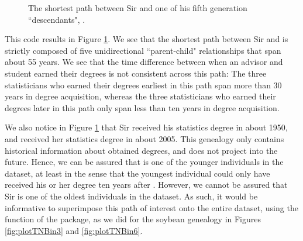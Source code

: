 \documentclass[article,shortnames]{jss}
\begin{document}
\begin{figure}[H]
    \centering
    \caption{The shortest path between Sir  and one of his fifth generation ``descendants", .}
    \label{fig:pathCB}
\end{figure}

This code results in Figure \ref{fig:pathCB}. We see that the shortest path between Sir  and  is strictly composed of five unidirectional ``parent-child" relationships that span about 55 years. We see that the time difference between when an advisor and student earned their degrees is not consistent across this path: The three statisticians who earned their degrees earliest in this path span more than 30 years in degree acquisition, whereas the three statisticians who earned their degrees later in this path only span less than ten years in degree acquisition.

We also notice in Figure \ref{fig:pathCB} that Sir  received his statistics degree in about 1950, and  received her statistics degree in about 2005. This genealogy only contains historical information about obtained degrees, and does not project into the future. Hence, we can be assured that  is one of the younger individuals in the dataset, at least in the sense that the youngest individual could only have received his or her degree ten years after . However, we cannot be assured that Sir  is one of the oldest individuals in the dataset. As such, it would be informative to superimpose this path of interest onto the entire dataset, using the  function of the  package, as we did for the soybean genealogy in Figures \ref{fig:plotTNBin3} and \ref{fig:plotTNBin6}.
\end{document}
